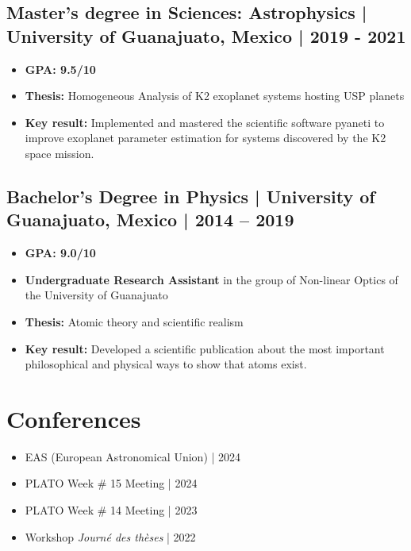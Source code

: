 \documentclass[11pt,a4paper]{article}
\begin{document}
\begin{multicols}{2}
		\subsection{Master's degree in Sciences: Astrophysics | University of Guanajuato, Mexico | 2019 - 2021}
		\begin{itemize}
		\item \textbf{GPA: 9.5/10}
		\item \textbf{Thesis:} Homogeneous Analysis of K2 exoplanet systems hosting USP planets
		\item \textbf{Key result:} Implemented and mastered the scientific software pyaneti to improve exoplanet parameter estimation for systems discovered by the K2 space mission. 
		\end{itemize}
		
		\subsection{ Bachelor's Degree in Physics | University of Guanajuato, Mexico | 2014 – 2019}
		\begin{itemize}
			\item \textbf{GPA: 9.0/10}
			\item \textbf{Undergraduate Research Assistant} in the group of Non-linear Optics of the University of Guanajuato
			\item \textbf{Thesis:} Atomic theory and scientific realism
			\item \textbf{Key result:} Developed a scientific publication about the most important philosophical and physical ways to show that atoms exist. 
		\end{itemize}
	
	\end{multicols}
	
	\section{Conferences}

		\begin{itemize}
			\item EAS (European Astronomical Union) | 2024
			\item PLATO Week \# 15 Meeting | 2024
			\item PLATO Week \# 14 Meeting | 2023
			\item Workshop \textit{Journé des thèses} | 2022
		\end{itemize}

	
\end{document}
